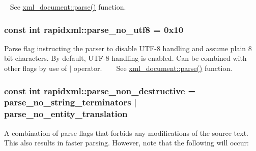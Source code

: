 ~\newline
 See \hyperlink{singletonrapidxml_1_1xml__document_ac6e73ff9ac323bf5a370c38feb03a6b1}{xml\+\_\+document\+::parse()} function. \hypertarget{namespacerapidxml_a22d4aefaceb00d7afabfef7107b108da}{
\subsubsection[{parse\+\_\+no\+\_\+utf8}]{\setlength{\rightskip}{0pt plus 5cm}const int rapidxml\+::parse\+\_\+no\+\_\+utf8 = 0x10}}\label{namespacerapidxml_a22d4aefaceb00d7afabfef7107b108da}
Parse flag instructing the parser to disable U\+T\+F-\/8 handling and assume plain 8 bit characters. By default, U\+T\+F-\/8 handling is enabled. Can be combined with other flags by use of $\vert$ operator. ~\newline
~\newline
 See \hyperlink{singletonrapidxml_1_1xml__document_ac6e73ff9ac323bf5a370c38feb03a6b1}{xml\+\_\+document\+::parse()} function. \hypertarget{namespacerapidxml_a45d4d8fef551beaaba23a83b847fd6a3}{
\subsubsection[{parse\+\_\+non\+\_\+destructive}]{\setlength{\rightskip}{0pt plus 5cm}const int rapidxml\+::parse\+\_\+non\+\_\+destructive = {\bf parse\+\_\+no\+\_\+string\+\_\+terminators} $\vert$ {\bf parse\+\_\+no\+\_\+entity\+\_\+translation}}}\label{namespacerapidxml_a45d4d8fef551beaaba23a83b847fd6a3}
A combination of parse flags that forbids any modifications of the source text. This also results in faster parsing. However, note that the following will occur\+: 

